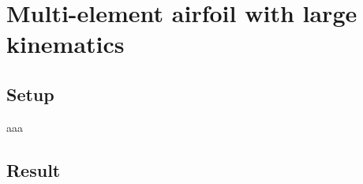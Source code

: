 \documentclass[../main.tex]{subfiles}
\begin{document}


\section{Multi-element airfoil with large kinematics}\label{sec:example_multielem}

\subsection{Setup}
aaa
\subsection{Result}
\end{document}
